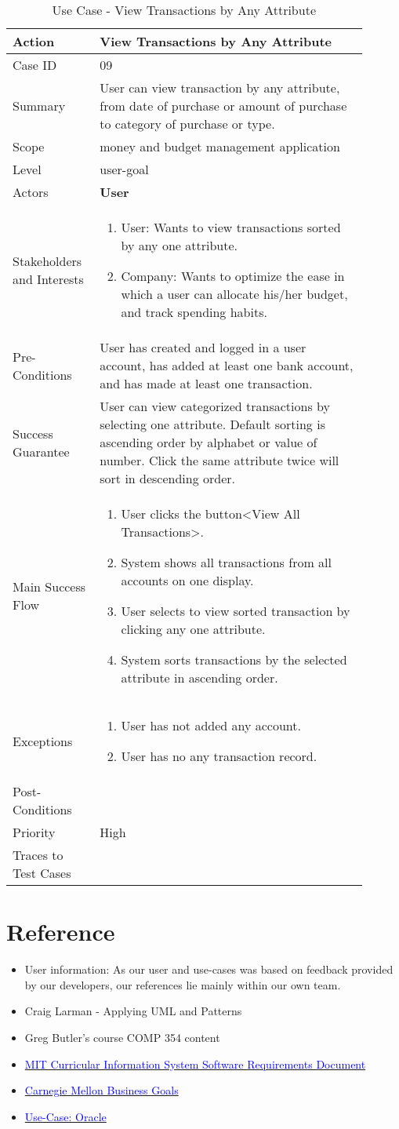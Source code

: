 \documentclass[11pt]{article}
\newcounter{use case ID}
\newcommand\tabularhead[1]{
    \begin{table}[ht]
        \addtocounter{use case ID}{1}
        \caption{Use Case \arabic{use case ID} - #1}
        \vspace{0.2cm}
        \begin{tabular}{|p{0.2\linewidth}|p{0.70\linewidth}|}
            \hline
            \textbf{Action} & \textbf{#1} \\
            \hline}
\newcommand\addrow[2]{#1 & #2\\ \hline}
\newcommand\addmulrow[2]{ \begin{minipage}[t][][t]{2.5cm}#1\end{minipage}
                &\begin{minipage}[t][][t]{11cm}
                    \begin{enumerate}[itemsep=-1ex] #2   \end{enumerate}
                \end{minipage}\vfill\\ \hline}
\newenvironment{usecase}{\tabularhead}
        {\hline\end{tabular}\end{table}}
\begin{document}
\begin{usecase}{View Transactions by Any Attribute}
    \addrow{Case ID}{09}
    \addrow{Summary}{User can view transaction by any attribute, from date of purchase or amount of purchase to category of purchase or type.}
    \addrow{Scope}{money and budget management application}
    \addrow{Level}{user-goal}
    \addrow{Actors}{\textbf{User}}
    \addmulrow{Stakeholders and Interests}{
    \item User: Wants to view transactions sorted by any one attribute.
    \item Company: Wants to optimize the ease in which a user can allocate his/her budget, and track spending habits.}
    \addrow{Pre-Conditions}{User has created and logged in a user account, has added at least one bank account, and has made at least one transaction.}
    \addrow{Success Guarantee}{User can view categorized transactions by selecting one attribute. Default sorting is ascending order by alphabet or value of number. Click the same attribute twice will sort in descending order.}
    \addmulrow{Main Success Flow}{
    \item User clicks the button<View All Transactions>.
    \item System shows all transactions from all accounts on one display.
    \item User selects to view sorted transaction by clicking any one attribute.
    \item System sorts transactions by the selected attribute in ascending order.}
    \addmulrow{Exceptions}{
    \item User has not added any account.
    \item User has no any transaction record.}
    \addrow{Post-Conditions}{}
    \addrow{Priority}{High}
    \addrow{Traces to Test Cases}{}
\end{usecase}

\clearpage
\section{Reference}

\begin{itemize}
    \item User information: As our user and use-cases was based on feedback provided by our developers, our references lie mainly within our own team.
    \item Craig Larman - Applying UML and Patterns
    \item Greg Butler's course COMP 354 content
    \item \href{http://web.mit.edu/ssit/cis/CISRequirements.html}{\textcolor{blue}{MIT Curricular Information System
        Software Requirements Document}}
    \item \href{https://resources.sei.cmu.edu/asset_files/TechnicalReport/2005_005_001_14621.pdf}{\textcolor{blue}{Carnegie Mellon Business Goals}}
    \item \href{http://www.oracle.com/technetwork/testcontent/gettingstartedwithusecasemodeling-133857.pdf}{\textcolor{blue}{Use-Case: Oracle }}

\end{itemize}
\end{document}
